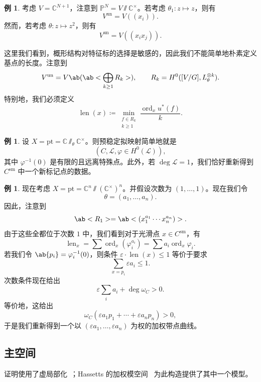 \documentclass{amsart}
\theoremstyle{definition}
\newtheorem{exm}[thm]{例}
\theoremstyle{remark}
\theoremstyle{plain}
\theoremstyle{definition}
\theoremstyle{remark}
\newcommand{\C}{\mathbb{C}}
\renewcommand{\P}{\mathbb{P}}
\newcommand{\ep}{\varepsilon}
\newcommand{\mc}[1]{\mathcal{#1}}
\newcommand{\mr}[1]{\mathrm{#1}}
\newcommand{\on}[1]{\operatorname{#1}}
\newcommand{\1}{\mathbf{1}}
\newcommand{\2}{\mathbf{2}}
\newcommand{\3}{\mathbf{3}}
\begin{document}
\begin{exm}
    考虑 \(V = \C^{N+1}\)，注意到 \(\P^N = V \sslash \C^{\times}\)。若考虑 \(\theta_1 \colon z \mapsto z\)，则有 
    \[ V^{\on{un}} = V((x_i)). \]
    然而，若考虑 \(\theta \colon z \mapsto z^2\)，则有
    \[ V^{\on{un}} = V((x_i x_j)). \]
\end{exm}

这里我们看到，概形结构对特征标的选择是敏感的，因此我们不能简单地朴素定义基点的长度。注意到
\[ V^{\on{un}} = V\ab(\ab< \bigoplus_{k \geq 1} R_k>), \qquad R_k = H^0([V/G], L_{\theta}^{\otimes k}). \]
特别地，我们必须定义
\[ \on{len}(x) \coloneqq \min_{\substack{f \in R_k \\ k \geq 1}} \frac{\on{ord}_x u^*(f)}{k}. \]

\begin{exm}
    设 \(X = \mr{pt} = \C \sslash_{\theta} \C^{\times}\)。则预稳定拟映射简单地就是
    \[ (C, \mc{L}, \varphi \in H^0(\mc{L})), \]
    其中 \(\varphi^{-1}(0)\) 是有限的且远离特殊点。此外，若 \(\deg \mc{L} = 1\)，我们恰好重新得到 \(C^{\mr{sm}}\) 中一个新标记点的数据。
\end{exm}

\begin{exm}
    现在考虑 \(X = \mr{pt} = \C^n \sslash (\C^{\times})^n\)。并假设次数为 \((1, \ldots, 1)\)。现在我们令
    \[ \theta = (a_1, \ldots, a_n). \]
    因此，注意到
    \[ \ab<R_1> = \ab<(x_1^{a_1} \cdots x_n^{a_n})>. \]
    由于这些全都位于次数 \(1\) 中，我们看到对于光滑点 \(x \in C^{\mr{sm}}\)，有
    \[ \on{len}_x = \sum \on{ord}_x (\varphi_i^{a_i}) = \sum a_i \on{ord}_x \varphi_i. \]
    若我们令 \(\ab\{p_i\} = \varphi_i^{-1}(0)\)，则条件 \(\ep \cdot \on{len}(x) \leq 1\) 等价于要求
    \[ \sum_{x = p_i} \ep a_i \leq 1. \]
    次数条件现在给出
    \[ \ep \sum_i a_i + \deg \omega_C > 0. \]
    等价地，这给出
    \[ \omega_C(\ep a_1 p_1 + \cdots + \ep a_n p_n) > 0, \]
    于是我们重新得到一个以 \((\ep a_1, \ldots, \ep a_n)\) 为权的加权带点曲线。
\end{exm}

\subsection{主空间}%
\label{sub:Master space}

证明使用了虚局部化~\cite{GP1999}；Hassett\textquotesingle s 的加权模空间~\cite{Hassett2003} 为此构造提供了其中一个模型。
\end{document}
